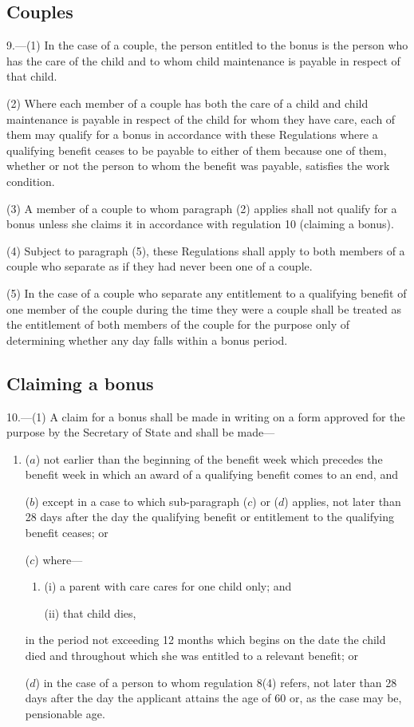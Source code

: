 \documentclass[a4paper]{article}
\begin{document}
\subsection[9. Couples]{Couples}

9.—(1) In the case of a couple, the person entitled to the bonus is the person who has the care of the child and to whom child maintenance is payable in respect of that child.

(2) Where each member of a couple has both the care of a child and child maintenance is payable in respect of the child for whom they have care, each of them may qualify for a bonus in accordance with these Regulations where a qualifying benefit ceases to be payable to either of them because one of them, whether or not the person to whom the benefit was payable, satisfies the work condition.

(3) A member of a couple to whom paragraph (2) applies shall not qualify for a bonus unless she claims it in accordance with regulation 10 (claiming a bonus).

(4) Subject to paragraph (5), these Regulations shall apply to both members of a couple who separate as if they had never been one of a couple.

(5) In the case of a couple who separate any entitlement to a qualifying benefit of one member of the couple during the time they were a couple shall be treated as the entitlement of both members of the couple for the purpose only of determining whether any day falls within a bonus period.

\subsection[10. Claiming a bonus]{Claiming a bonus}

10.—(1) A claim for a bonus shall be made in writing on a form approved for the purpose by the Secretary of State and shall be made—
\begin{enumerate}\item[]
($a$) not earlier than the beginning of the benefit week which precedes the benefit week in which an award of a qualifying benefit comes to an end, and

($b$) except in a case to which sub-paragraph ($c$) or ($d$) applies, not later than 28 days after the day the qualifying benefit or entitlement to the qualifying benefit ceases; or

($c$) where—
\begin{enumerate}\item[]
(i) a parent with care cares for one child only; and

(ii) that child dies,
\end{enumerate}
in the period not exceeding 12 months which begins on the date the child died and throughout which she was entitled to a relevant benefit; or

($d$) in the case of a person to whom regulation 8(4) refers, not later than 28 days after the day the applicant attains the age of 60 or, as the case may be, pensionable age.
\end{enumerate}
\end{document}
